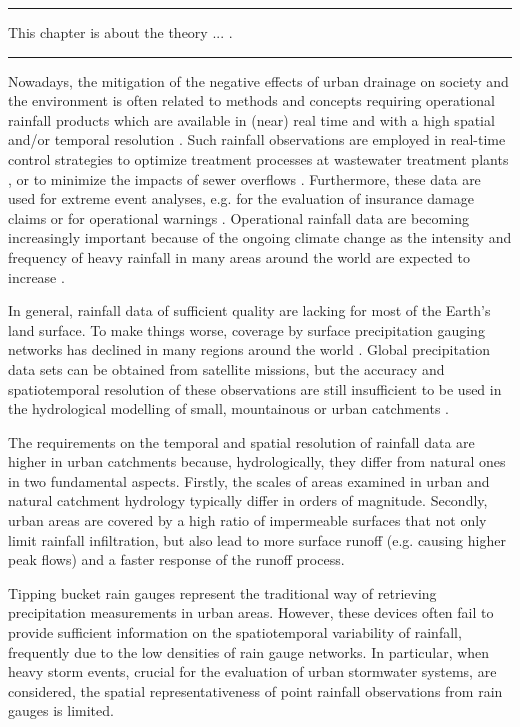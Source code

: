 \documentclass{ctuthesis}\usepackage[]{graphicx}\usepackage[]{color}
\begin{document}
\rule{\textwidth}{0.4pt}
This chapter is about the theory ... . \newline
\rule[0.2cm]{\textwidth}{0.4pt}


Nowadays, the mitigation of the negative effects of urban drainage on society and the environment is often related to methods and concepts requiring operational rainfall products which are available in (near) real time and with a high spatial and/or temporal resolution \citep{einfaltRoadmapUseRadar2004}. Such rainfall observations are employed in real-time control strategies to optimize treatment processes at wastewater treatment plants \citep{schutzeRealTimeControl2004}, or to minimize the impacts of sewer overflows \citep{vezzaroGeneralisedDynamicOverflow2014}. Furthermore, these data are used for extreme event analyses, e.g. for the evaluation of insurance damage claims \citep{spekkersStatisticalAnalysisInsurance2013} or for operational warnings \citep{montesarchioRainfallThresholdsFlood2009}. Operational rainfall data are becoming increasingly important because of the ongoing climate change \citep{vanderpolImpactsRainfallVariability2015} as the intensity and frequency of heavy rainfall in many areas around the world are expected to increase \citep{willemsClimateChangeImpact2012}.

In general, rainfall data of sufficient quality are lacking for most of the Earth’s land surface. To make things worse, coverage by surface precipitation gauging networks has declined in many regions around the world \citep{lorenzHydrologicalCycleThree2012}. Global precipitation data sets can be obtained from satellite missions, but the accuracy and spatiotemporal resolution of these observations are still insufficient to be used in the hydrological modelling of small, mountainous or urban catchments \citep{kiddGlobalPrecipitationMeasurement2011}.

The requirements on the temporal and spatial resolution of rainfall data are higher in urban catchments \citep[e.g.][]{schilling1991rainfall, berneTemporalSpatialResolution2004} because, hydrologically, they differ from natural ones in two fundamental aspects. Firstly, the scales of areas examined in urban and natural catchment hydrology typically differ in orders of magnitude. Secondly, urban areas are covered by a high ratio of impermeable surfaces that not only limit rainfall infiltration, but also lead to more surface runoff (e.g. causing higher peak flows) and a faster response of the runoff process.

Tipping bucket rain gauges represent the traditional way of retrieving precipitation measurements in urban areas. However, these devices often fail to provide sufficient information on the spatiotemporal variability of rainfall, frequently due to the low densities of rain gauge networks. In particular, when heavy storm events, crucial for the evaluation of urban stormwater systems, are considered, the spatial representativeness of point rainfall observations from rain gauges is limited. 
\end{document}
